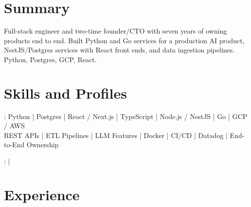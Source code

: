 \documentclass[print]{jack-resume}
\begin{document}
\pagecolor{darkmodeBackground}


\begin{minipage}[t][1cm][t]{.03\textwidth}
    \hfill
\end{minipage}

\section{Summary}
Full-stack engineer and two-time founder/CTO with seven years of owning products end to end. Built Python and Go services for a production AI product, NestJS/Postgres services with React front ends, and data ingestion pipelines. Python, Postgres, GCP, React.
\sectionsep

\section{Skills and Profiles}
:
Python \hfill | \hfill
Postgres \hfill | \hfill
React / Next.js \hfill | \hfill
TypeScript \hfill | \hfill
Node.js / NestJS \hfill | \hfill
Go \hfill | \hfill
GCP / AWS \\
\hspace{1.0cm} REST APIs \hfill | \hfill
ETL Pipelines \hfill | \hfill
LLM Features \hfill | \hfill
Docker \hfill | \hfill
CI/CD \hfill | \hfill
Datadog \hfill | \hfill
End-to-End Ownership \\

\raggedright{
    :
      \href{https://www.linkedin.com/in/jack-sturtevant/}{ \ExternalLink} |
     \href{https://github.com/jacksturt}{ \ExternalLink}}

\section{Experience}
\end{document}
